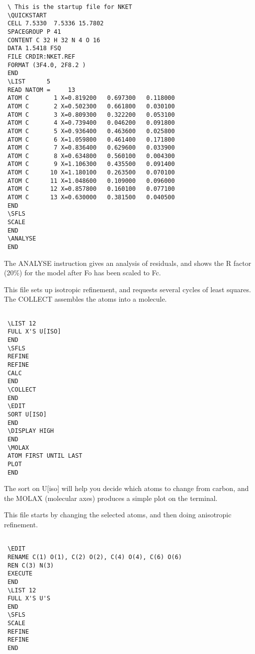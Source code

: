 \documentclass[10pt,a4paper]{report}
\begin{document}
\small\begin{verbatim}
 \ This is the startup file for NKET
 \QUICKSTART
 CELL 7.5330  7.5336 15.7802
 SPACEGROUP P 41
 CONTENT C 32 H 32 N 4 O 16
 DATA 1.5418 FSQ
 FILE CRDIR:NKET.REF
 FORMAT (3F4.0, 2F8.2 )
 END
 \LIST      5
 READ NATOM =     13
 ATOM C       1 X=0.819200   0.697300   0.118000
 ATOM C       2 X=0.502300   0.661800   0.030100
 ATOM C       3 X=0.809300   0.322200   0.053100
 ATOM C       4 X=0.739400   0.046200   0.091800
 ATOM C       5 X=0.936400   0.463600   0.025800
 ATOM C       6 X=1.059800   0.461400   0.171800
 ATOM C       7 X=0.836400   0.629600   0.033900
 ATOM C       8 X=0.634800   0.560100   0.004300
 ATOM C       9 X=1.106300   0.435500   0.091400
 ATOM C      10 X=1.180100   0.263500   0.070100
 ATOM C      11 X=1.048600   0.109000   0.096000
 ATOM C      12 X=0.857800   0.160100   0.077100
 ATOM C      13 X=0.630000   0.381500   0.040500
 END
 \SFLS
 SCALE
 END
 \ANALYSE
 END
\end{verbatim}\normalsize




The ANALYSE instruction gives an analysis of residuals, and shows the
 R factor (20\%) for the model after Fo has been scaled to Fc.





\bigskip{}


 This file sets up isotropic refinement, and requests several cycles of
 least squares. The COLLECT assembles the atoms into a molecule.

\small\begin{verbatim}

 \LIST 12
 FULL X'S U[ISO]
 END
 \SFLS
 REFINE
 REFINE
 CALC
 END
 \COLLECT
 END
 \EDIT
 SORT U[ISO]
 END
 \DISPLAY HIGH
 END
 \MOLAX
 ATOM FIRST UNTIL LAST
 PLOT
 END
\end{verbatim}\normalsize


 The sort on U[iso] will help you decide which atoms to change from carbon,
 and the MOLAX (molecular axes) produces a simple plot on the terminal.





\bigskip{}


 This file starts by changing the selected atoms, and then doing anisotropic
 refinement.

\small\begin{verbatim}

 \EDIT
 RENAME C(1) O(1), C(2) O(2), C(4) O(4), C(6) O(6)
 REN C(3) N(3)
 EXECUTE
 END
 \LIST 12
 FULL X'S U'S
 END
 \SFLS
 SCALE
 REFINE
 REFINE
 END
\end{verbatim}\normalsize
\end{document}

